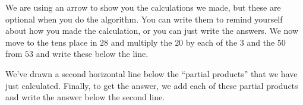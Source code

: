 \documentclass{ximera}
\begin{document}
We are using an arrow to show you the calculations we made, but these are optional when you do the algorithm. You can write them to remind yourself about how you made the calculation, or you can just write the answers. We now move to the tens place in $28$ and multiply the $20$ by each of the $3$ and the $50$ from $53$ and write these below the line.

\begin{image}
\end{image}

We've drawn a second horizontal line below the ``partial products'' that we have just calculated. Finally, to get the answer, we add each of these partial products and write the answer below the second line. 
\end{document}
